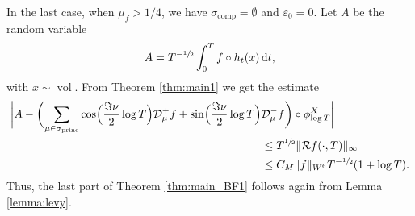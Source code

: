 \documentclass[JEP,XML,SOM,NoEqCountersInSection,Unicode,published]{cedram}
\newcommand*{\diff}{\mathop{}\!\mathrm{d}}
\newcommand{\Dp}[1]{\mathcal{D}_\mu^{+} #1}
\newcommand{\Dm}[1]{\mathcal{D}_\mu^{-} #1}
\DeclareMathOperator{\vol}{vol}
\DeclareMathOperator{\comp}{comp}
\DeclareMathOperator{\princ}{princ}
\theoremstyle{definition}
\begin{document}
In the last case, when $\mu_f > 1/4$, we have $\sigma_{\comp} = \emptyset$ and $\varepsilon_0=0$.
Let $A$ be the random variable
\[
A = T^{-\sfrac{1}{2}} \int_0^T f \circ h_t(x) \diff t,
\]
with $x \sim \vol$.
From Theorem \ref{thm:main1} we get the estimate
\begin{align*}
\biggl\lvert A - \biggl(\sum_{\mu \in \sigma_{\princ}} \cos\Bigl(\frac{\Im\nu}{2} \log T \Bigr) \Dp{ f} + \sin\Bigl(\frac{\Im\nu}{2} \log T \Bigr) &\Dm{ f} \biggr)\circ \phi^X_{\log T} \biggr\rvert\\
&\leq T^{\sfrac{1}{2}} \|\mathcal{R}f(\cdot, T) \|_{\infty} \\
& \leq C_M \|f\|_{W^6} T^{-\sfrac{1}{2}} (1+\log T).
\end{align*}
Thus, the last part of Theorem \ref{thm:main_BF1} follows again from Lemma \ref{lemma:levy}.
\end{document}
